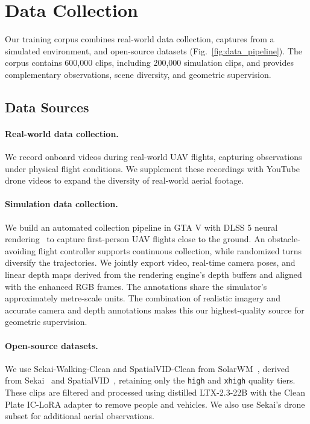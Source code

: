 \section{Data Collection}
\label{sec:data}

Our training corpus combines real-world data collection, captures from a simulated environment, and open-source datasets (Fig.~\ref{fig:data_pipeline}).
The corpus contains 600,000 clips, including 200,000 simulation clips, and provides complementary observations, scene diversity, and geometric supervision.

\subsection{Data Sources}
\label{sec:data_sources}

\paragraph{Real-world data collection.}
We record onboard videos during real-world UAV flights, capturing observations under physical flight conditions.
We supplement these recordings with YouTube drone videos to expand the diversity of real-world aerial footage.

\paragraph{Simulation data collection.}
We build an automated collection pipeline in GTA V with DLSS 5 neural rendering~\cite{nvidia2026dlss5} to capture first-person UAV flights close to the ground.
An obstacle-avoiding flight controller supports continuous collection, while randomized turns diversify the trajectories.
We jointly export video, real-time camera poses, and linear depth maps derived from the rendering engine's depth buffers and aligned with the enhanced RGB frames.
The annotations share the simulator's approximately metre-scale units.
The combination of realistic imagery and accurate camera and depth annotations makes this our highest-quality source for geometric supervision.

\paragraph{Open-source datasets.}
We use Sekai-Walking-Clean and SpatialVID-Clean from SolarWM~\cite{huang2026solarwmopendatascalable}, derived from Sekai~\cite{li2025sekaivideodatasetworld} and SpatialVID~\cite{wang2025spatialvidlargescalevideodataset}, retaining only the \texttt{high} and \texttt{xhigh} quality tiers.
These clips are filtered and processed using distilled LTX-2.3-22B with the Clean Plate IC-LoRA adapter to remove people and vehicles.
We also use Sekai's drone subset for additional aerial observations.

